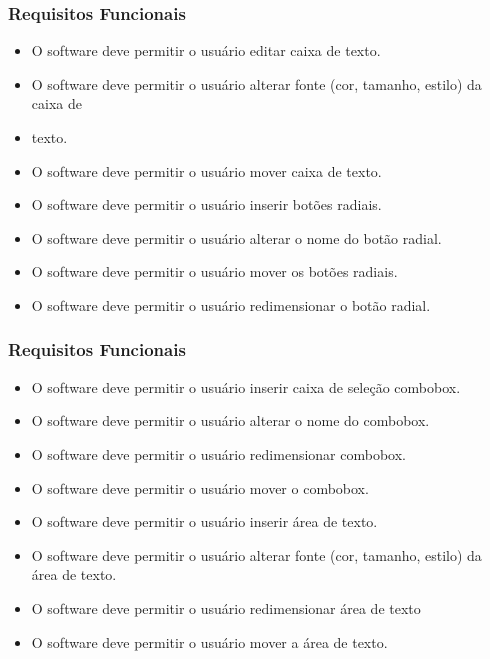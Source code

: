 \documentclass{beamer}
\begin{document}
\begin{frame}
  \frametitle{Requisitos Funcionais}
\begin{itemize}

\item  O software deve permitir o usuário  editar caixa de texto.
\item   O software deve permitir o usuário  alterar fonte (cor, tamanho, estilo) da caixa de \item  texto.
\item   O software deve permitir o usuário  mover caixa de texto.
\item   O software deve permitir o usuário  inserir botões radiais.
\item   O software deve permitir o usuário  alterar o nome do botão radial.
\item   O software deve permitir o usuário  mover os botões radiais.
\item  O software deve permitir o usuário  redimensionar o botão radial.



\end{itemize}

	\end{frame}

\begin{frame}
  \frametitle{Requisitos Funcionais}
\begin{itemize}

\item   O software deve permitir o usuário  inserir caixa de seleção combobox.
\item   O software deve permitir o usuário  alterar o nome do combobox.
\item   O software deve permitir o usuário  redimensionar combobox.
\item   O software deve permitir o usuário  mover o combobox.
\item  O software deve permitir o usuário  inserir área de texto.
\item O software deve permitir o usuário  alterar fonte (cor, tamanho, estilo) da área de texto.
\item  O software deve permitir o usuário  redimensionar área de texto
\item  O software deve permitir o usuário  mover a área de texto.


\end{itemize}

	\end{frame}
\end{document}
